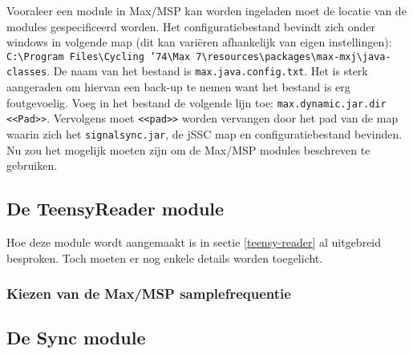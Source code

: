 Vooraleer een module in Max/MSP kan worden ingeladen moet de locatie van de modules gespecificeerd worden. Het configuratiebestand bevindt zich onder windows in volgende map (dit kan variëren afhankelijk van eigen instellingen): \texttt{C:\textbackslash Program Files\textbackslash Cycling '74\textbackslash Max 7\textbackslash resources\textbackslash packages\textbackslash max-mxj\textbackslash java-classes}. De naam van het bestand is \texttt{max.java.config.txt}. Het is sterk aangeraden om hiervan een back-up te nemen want het bestand is erg foutgevoelig. Voeg in het bestand de volgende lijn toe: \texttt{max.dynamic.jar.dir <<Pad>>}. Vervolgens moet \texttt{<<pad>>} worden vervangen door het pad van de map waarin zich het \texttt{signalsync.jar}, de jSSC map en configuratiebestand bevinden. Nu zou het mogelijk moeten zijn om de Max/MSP modules beschreven te gebruiken.

\subsection*{De TeensyReader module}

Hoe deze module wordt aangemaakt is in sectie \ref{teensy-reader} al uitgebreid besproken. Toch moeten er nog enkele details worden toegelicht.

\subsubsection{Kiezen van de Max/MSP samplefrequentie}



\subsection*{De Sync module}